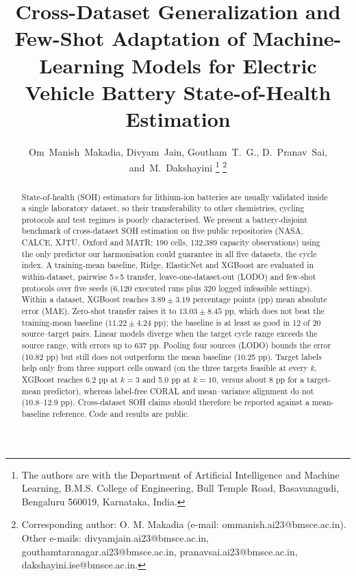\documentclass[journal]{IEEEtran}
\begin{document}
\title{Cross-Dataset Generalization and Few-Shot Adaptation of Machine-Learning Models for Electric Vehicle Battery State-of-Health Estimation}

\author{Om~Manish~Makadia,
        Divyam~Jain,
        Goutham~T.~G.,
        D.~Pranav~Sai,
        and~M.~Dakshayini%
\thanks{The authors are with the Department of Artificial Intelligence and Machine Learning, B.M.S. College of Engineering, Bull Temple Road, Basavanagudi, Bengaluru 560019, Karnataka, India.}%
\thanks{Corresponding author: O. M. Makadia (e-mail: ommanish.ai23@bmsce.ac.in). Other e-mails: divyamjain.ai23@bmsce.ac.in, gouthamtaranagar.ai23@bmsce.ac.in, pranavsai.ai23@bmsce.ac.in, dakshayini.ise@bmsce.ac.in.}}

\maketitle

\begin{abstract}
State-of-health (SOH) estimators for lithium-ion batteries are usually validated inside a single laboratory dataset, so their transferability to other chemistries, cycling protocols and test regimes is poorly characterised. We present a battery-disjoint benchmark of cross-dataset SOH estimation on five public repositories (NASA, CALCE, XJTU, Oxford and MATR; 190 cells, 132,389 capacity observations) using the only predictor our harmonisation could guarantee in all five datasets, the cycle index. A training-mean baseline, Ridge, ElasticNet and XGBoost are evaluated in within-dataset, pairwise 5$\times$5 transfer, leave-one-dataset-out (LODO) and few-shot protocols over five seeds (6,120 executed runs plus 320 logged infeasible settings). Within a dataset, XGBoost reaches $3.89\pm3.19$ percentage points (pp) mean absolute error (MAE). Zero-shot transfer raises it to $13.03\pm8.45$ pp, which does not beat the training-mean baseline ($11.22\pm4.24$ pp); the baseline is at least as good in 12 of 20 source--target pairs. Linear models diverge when the target cycle range exceeds the source range, with errors up to 637 pp. Pooling four sources (LODO) bounds the error (10.82 pp) but still does not outperform the mean baseline (10.25 pp). Target labels help only from three support cells onward (on the three targets feasible at every $k$, XGBoost reaches 6.2 pp at $k{=}3$ and 5.0 pp at $k{=}10$, versus about 8 pp for a target-mean predictor), whereas label-free CORAL and mean--variance alignment do not (10.8--12.9 pp). Cross-dataset SOH claims should therefore be reported against a mean-baseline reference. Code and results are public.
\end{abstract}
\end{document}
